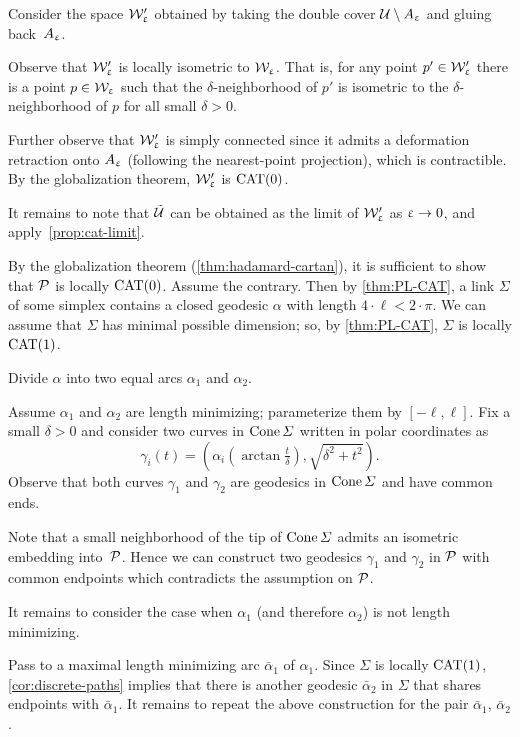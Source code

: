 Consider the space $\mathcal{W}'_\upvarepsilon$ obtained by
taking the double cover $\mathcal{U}\setminus A_\upvarepsilon$ and gluing back~$A_\upvarepsilon$.

Observe that $\mathcal{W}'_\upvarepsilon$ is locally isometric to $\mathcal{W}_\upvarepsilon$. 
That is, for any point $p'\in\spc{W}'_\eps$ there is a point $p\in\spc{W}_\eps$ such that the $\delta$-neighborhood of $p'$ is isometric to the $\delta$-neighborhood of $p$ for all small $\delta>0$.

Further observe that $\mathcal{W}'_\upvarepsilon$ is simply connected since it admits a deformation retraction onto $A_\upvarepsilon$ (following the nearest-point projection), which is contractible.
By the globalization theorem, $\mathcal{W}'_\upvarepsilon$ is $\mathrm{CAT}(0)$.

It remains to note that $\tilde {\mathcal{U}}$ can be obtained as the limit of $\mathcal{W}'_\upvarepsilon$ as $\eps\to 0$, and apply~\ref{prop:cat-limit}.

By the globalization theorem (\ref{thm:hadamard-cartan}),
it is sufficient to show that $\mathcal{P}$ is locally $\mathrm{CAT}(0)$.
Assume the contrary.
Then by \ref{thm:PL-CAT}, a link $\Sigma$ of some simplex contains a closed geodesic $\alpha$ with length $4\cdot\ell<2\cdot\pi$.
We can assume that $\Sigma$ has minimal possible dimension;
so, by \ref{thm:PL-CAT}, $\Sigma$ is locally $\mathrm{CAT}(1)$.

Divide $\alpha$ into two equal arcs $\alpha_1$ and $\alpha_2$.

Assume $\alpha_1$ and $\alpha_2$ are length minimizing;
parameterize them by $[-\ell,\ell]$.
Fix a small $\delta>0$ and 
consider two curves in $\mathop{\rm Cone}\nolimits\varSigma$ written in polar coordinates as 
\[\gamma_i(t)=(\alpha_i(\arctan \tfrac t\delta),\sqrt{\delta^2+t^2}).\]
Observe that both curves $\gamma_1$ and $\gamma_2$ are geodesics in $\mathop{\rm Cone}\nolimits\varSigma$ and have common ends.

Note that a small neighborhood of the tip of $\mathop{\rm Cone}\nolimits\varSigma$ admits an isometric embedding into~$\mathcal{P}$.
Hence we can construct two geodesics $\gamma_1$ and $\gamma_2$ in $\mathcal{P}$ with common endpoints which contradicts the assumption on $\mathcal{P}$.

It remains to consider the case when $\alpha_1$ (and therefore $\alpha_2$) is not length minimizing.

Pass to a maximal length minimizing arc $\bar\alpha_1$ of $\alpha_1$.
Since $\Sigma$ is locally $\mathrm{CAT}(1)$, \ref{cor:discrete-paths} implies that 
there is another geodesic $\bar\alpha_2$ in $\Sigma$ that shares endpoints with $\bar\alpha_1$.
It remains to repeat the above construction for the pair $\bar\alpha_1$, $\bar\alpha_2$.

